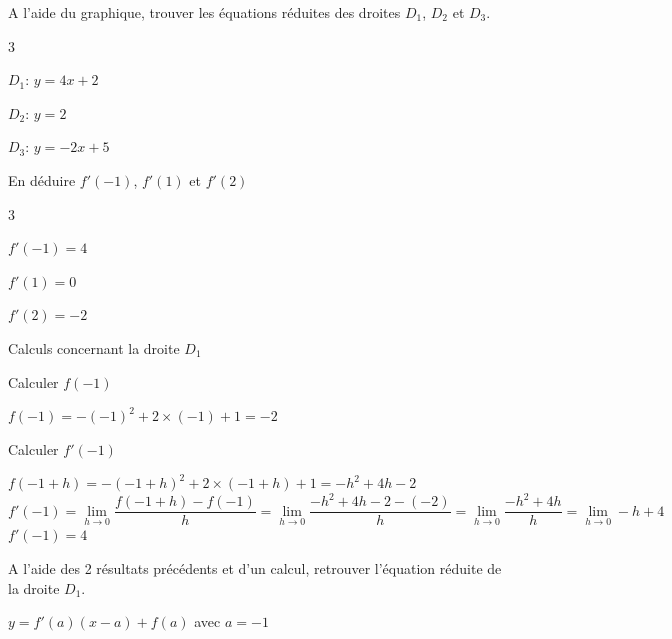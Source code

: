 \documentclass[12pt,a4paper]{article}  %
\begin{document}
\begin{enumMet}
	\item A l'aide du graphique, trouver les équations réduites des droites $D_1$, $D_2$ et $D_3$. \quad {}
	\begin{corrBox}
		\begin{multicols}{3}
			\begin{itemMet}
				\item $D_1$: $y=4x+2$
				\item $D_2$: $y=2$
				\item $D_3$: $y=-2x+5$
			\end{itemMet}
		\end{multicols}
	\end{corrBox}
	\item En déduire $f'(-1)$, $f'(1)$ et $f'(2)$ \quad \bareme{1,5}
	\begin{corrBox}
		\begin{multicols}{3}
			\begin{itemMet}
				\item $f'(-1)=4$
				\item $f'(1)=0$
				\item $f'(2)=-2$
			\end{itemMet}
		\end{multicols}
	\end{corrBox}
	\newpage
	\item Calculs concernant la droite $D_1$
	\begin{enumMet}
		\item Calculer $f(-1)$ \quad \bareme{0,5}
		\begin{corrBox}
			$f(-1)=-(-1)^{2}+2\times (-1)+1=-2$	
		\end{corrBox}
		\item Calculer $f'(-1)$ \quad \bareme{2}
		\begin{corrBox}
			$f(-1+h)=-(-1+h)^{2}+2\times (-1+h)+1=-h^2+4h-2$\\
			$f'(-1)=\lim\limits_{h \rightarrow 0} \dfrac{f(-1+h)-f(-1)}{h}=\lim\limits_{h \rightarrow 0} \dfrac{-h^2+4h-2-(-2)}{h}=\lim\limits_{h \rightarrow 0} \dfrac{-h^2+4h}{h}=\lim\limits_{h \rightarrow 0} -h+4$\\
			$f'(-1)=4$
		\end{corrBox}
		\item A l'aide des 2 résultats précédents et d'un calcul, retrouver l'équation réduite de la droite $D_1$. \quad \bareme{1} 
		\begin{corrBox}
			$y=f'(a)(x-a)+f(a)$ avec $a=-1$\\

\end{corrBox}
\end{enumMet}
\end{enumMet}
\end{document}
